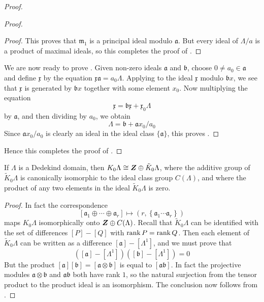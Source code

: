 \begin{proof}
\begin{proof}
\begin{proof}
	This proves that $\mathfrak{m}_{1}$ is a principal ideal modulo $\mathfrak{a}$. But every ideal of $\Lambda / a$ is a product of maximal ideals, so this completes the proof of .
\end{proof}

We are now ready to prove . Given non-zero ideals $\mathfrak{a}$ and $\mathfrak{b}$, choose $0 \neq a_{0} \in \mathfrak{a}$ and define $\mathfrak{x}$ by the equation $\mathfrak{x} \mathfrak{a}=a_{0} \Lambda$. Applying  to the ideal $\mathfrak{x}$ modulo $\mathfrak{b} x$, we see that $\mathfrak{x}$ is generated by $\mathfrak{b} x$ together with some element $x_{0}$. Now multiplying the equation
\[
\mathfrak{x}=\mathfrak{b} \mathfrak{x}+\mathfrak{x}_{0} \Lambda
\]
by $\mathfrak{a}$, and then dividing by $a_{0}$, we obtain
\[
\Lambda=\mathfrak{b}+\mathfrak{a} x_{0} / a_{0}
\]
Since $\mathfrak{a} x_{0} / a_{0}$ is clearly an ideal in the ideal class $\{\mathfrak{a}\}$, this proves .
\end{proof}
Hence this completes the proof of .
\end{proof}

\begin{cor}\label{1.11}
	If $\Lambda$ is a Dedekind domain, then $K_{0} \Lambda \cong \bm{Z} \oplus \tilde{K}_{0} \Lambda$, where the additive group of $\tilde{K}_{0} \Lambda$ is canonically isomorphic to the ideal class group $C(\Lambda)$, and where the product of any two elements in the ideal $\tilde{K}_{0} \Lambda$ is zero.
\end{cor}

\begin{proof}
	In fact the correspondence
	\[
		\left[\mathfrak{a}_{1} \oplus \cdots \oplus \mathfrak{a}_{r}\right] \mapsto\left(r,\left\{\mathfrak{a}_{1} \cdots \mathfrak{a}_{r}\right\}\right)
	\]
	maps $K_{0} \Lambda$ isomorphically onto $\bm{Z} \oplus C(\Lambda)$. Recall that $\tilde{K}_{0} \Lambda$ can be identified with the set of differences $[P]-[Q]$ with $\operatorname*{rank} P=\operatorname*{rank} Q$. Then each element of $\tilde{K}_{0} \Lambda$ can be written as a difference $[\mathfrak{a}]-\left[\Lambda^{1}\right]$, and we must prove that
	\[
		\left([\mathfrak{a}]-\left[\Lambda^{1}\right]\right)\left([\mathfrak{b}]-\left[\Lambda^{1}\right]\right)=0
	\]
	But the product $[\mathfrak{a}][\mathfrak{b}]=[\mathfrak{a} \otimes \mathfrak{b}]$ is equal to $[\mathfrak{a} \mathfrak{b}]$. In fact the projective modules $\mathfrak{a} \otimes \mathfrak{b}$ and $\mathfrak{a} \mathfrak{b}$ both have rank $1$, so the natural surjection from the tensor product to the product ideal is an isomorphism. The conclusion now follows from .
\end{proof}

